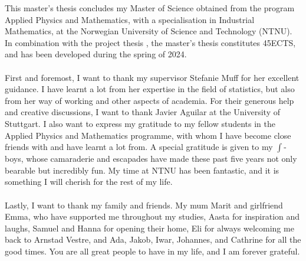 This master's thesis concludes my Master of Science obtained from the program Applied Physics and Mathematics, with a specialisation in Industrial Mathematics, at the Norwegian University of Science and Technology (NTNU). In combination with the project thesis \citep{Arnstad:Relative_variable_importance_in_Bayesian_linear_mixed_models:2024}, the master's thesis constitutes 45ECTS, and has been developed during the spring of 2024.
\\
\\
First and foremost, I want to thank my supervisor Stefanie Muff for her excellent guidance. I have learnt a lot from her expertise in the field of statistics, but also from her way of working and other aspects of academia. For their generous help and creative discussions, I want to thank Javier Aguilar at the University of Stuttgart. I also want to express my gratitude to my fellow students in the Applied Physics and Mathematics programme, with whom I have become close friends with and have learnt a lot from. A special gratitude is given to my $\int$-boys, whose camaraderie and escapades have made these past five years not only bearable but incredibly fun. My time at NTNU has been fantastic, and it is something I will cherish for the rest of my life. 
\\
\\
Lastly, I want to thank my family and friends. My mum Marit and girlfriend Emma, who have supported me throughout my studies, Aasta for inspiration and laughs, Samuel and Hanna for opening their home, Eli for always welcoming me back to Arnstad Vestre, and Ada, Jakob, Iwar, Johannes, and Cathrine for all the good times. You are all great people to have in my life, and I am forever grateful. 

